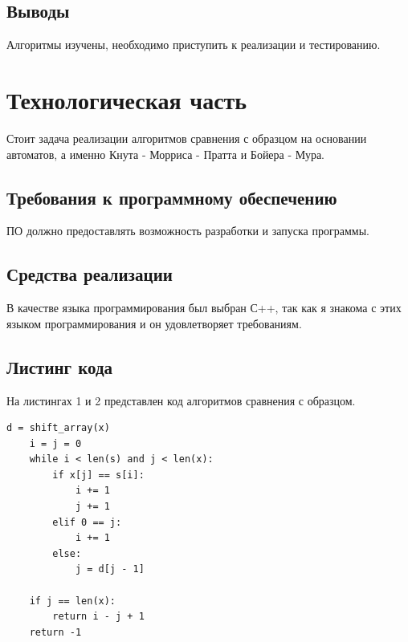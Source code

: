 \documentclass[a4paper,14pt]{article} %
\begin{document}
	\subsection{Выводы}
	\hfill
	
	Алгоритмы изучены, необходимо приступить к реализации и тестированию. 
	
	
		
    	\newpage

        \section{Технологическая часть}
        \hfill
        
        Стоит задача реализации алгоритмов сравнения с образцом на основании автоматов, а именно Кнута - Морриса - Пратта и Бойера - Мура. 
        
        \subsection{Требования к программному обеспечению}
        \hfill
        
        ПО должно предоставлять возможность разработки и запуска программы.
        \hfill
        
        \subsection{Средства реализации}
        \hfill
        
        В качестве языка программирования был выбран С++, так как я знакома с этих языком программирования и он удовлетворяет требованиям. 
        
        \subsection{Листинг кода}
        \hfill
        
        На листингах 1 и 2 представлен код алгоритмов сравнения с образцом. 
             
\begin{lstlisting}[caption=Алгоритм Кнута - Морриса - Пратта (КМП)]
    d = shift_array(x)
    i = j = 0
    while i < len(s) and j < len(x):
        if x[j] == s[i]:
            i += 1
            j += 1
        elif 0 == j:
            i += 1
        else:
            j = d[j - 1]

    if j == len(x):
        return i - j + 1
    return -1
\end{lstlisting}
\end{document}
